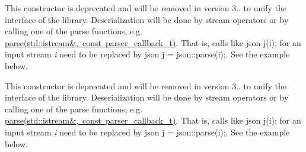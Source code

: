 
\begin{DoxyRefList}
\item[Member \mbox{\hyperlink{classnlohmann_1_1basic__json_a757e90574a742ae9cc54c97422fb3043}{nlohmann\+::basic\+\_\+json\texorpdfstring{$<$}{<} Object\+Type, Array\+Type, String\+Type, Boolean\+Type, Number\+Integer\+Type, Number\+Unsigned\+Type, Number\+Float\+Type, Allocator\+Type, JSONSerializer \texorpdfstring{$>$}{>}\+::basic\+\_\+json}} (std\+::istream \&i, const parser\+\_\+callback\+\_\+t cb=nullptr)]\label{deprecated__deprecated000001}%
%
This constructor is deprecated and will be removed in version 3.. to unify the interface of the library. Deserialization will be done by stream operators or by calling one of the {\ttfamily parse} functions, e.\+g. \mbox{\hyperlink{classnlohmann_1_1basic__json_a4cd30efe5c33a7cf73a0c6495bb16054}{parse(std\+::istream\&, const parser\+\_\+callback\+\_\+t)}}. That is, calls like {\ttfamily json j(i);} for an input stream {\itshape i} need to be replaced by {\ttfamily json j = json\+::parse(i);}. See the example below.

\label{deprecated__deprecated000002}%
%
This constructor is deprecated and will be removed in version 3.. to unify the interface of the library. Deserialization will be done by stream operators or by calling one of the {\ttfamily parse} functions, e.\+g. \mbox{\hyperlink{classnlohmann_1_1basic__json_a4cd30efe5c33a7cf73a0c6495bb16054}{parse(std\+::istream\&, const parser\+\_\+callback\+\_\+t)}}. That is, calls like {\ttfamily json j(i);} for an input stream {\itshape i} need to be replaced by {\ttfamily json j = json\+::parse(i);}. See the example below.
\end{DoxyRefList}